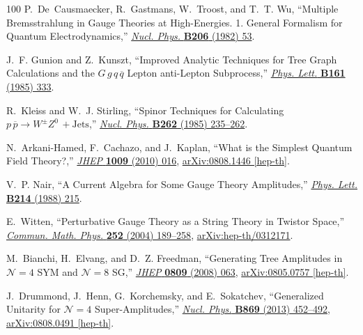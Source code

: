 \documentclass[12pt,hyperref,compress]{JHEP3}
\renewcommand{\bar}{\overline}
\begin{document}
\begin{thebibliography}{100}
P.~De~Causmaecker, R.~Gastmans, W.~Troost, and T.~T. Wu, ``{Multiple
  Bremsstrahlung in Gauge Theories at High-Energies. 1. General Formalism for
  Quantum Electrodynamics},''
\href{http://dx.doi.org/10.1016/0550-3213(82)90488-6}{{\em Nucl. Phys.} {\bf
  B206} (1982)  53}.

J.~F. Gunion and Z.~Kunszt, ``{Improved Analytic Techniques for Tree Graph
  Calculations and the $G\, g\, q\, \bar{q}$ Lepton anti-Lepton Subprocess},''
\href{http://dx.doi.org/10.1016/0370-2693(85)90774-9}{{\em Phys. Lett.} {\bf
  B161} (1985)  333}.

R.~Kleiss and W.~J. Stirling, ``{Spinor Techniques for Calculating
  $p\,\bar{p}\to W^\pm Z^0\,+\mathrm{Jets}$},''
\href{http://dx.doi.org/10.1016/0550-3213(85)90285-8}{{\em Nucl. Phys.} {\bf
  B262} (1985)  235--262}.

N.~Arkani-Hamed, F.~Cachazo, and J.~Kaplan, ``{What is the Simplest Quantum
  Field Theory?},'' \href{http://dx.doi.org/10.1007/JHEP09(2010)016}{{\em JHEP}
  {\bf 1009} (2010)  016},
\href{http://arxiv.org/abs/0808.1446}{{ arXiv:0808.1446 [hep-th]}}.

V.~P. Nair, ``{A Current Algebra for Some Gauge Theory Amplitudes},''
\href{http://dx.doi.org/10.1016/0370-2693(88)91471-2}{{\em Phys. Lett.} {\bf
  B214} (1988)  215}.

E.~Witten, ``{Perturbative Gauge Theory as a String Theory in Twistor Space},''
  \href{http://dx.doi.org/10.1007/s00220-004-1187-3}{{\em Commun. Math. Phys.}
  {\bf 252} (2004)  189--258},
\href{http://arxiv.org/abs/hep-th/0312171}{{ arXiv:hep-th/0312171}}.

M.~Bianchi, H.~Elvang, and D.~Z. Freedman, ``{Generating Tree Amplitudes in
  $\mathcal{N}\!=\!4$ SYM and $\mathcal{N}\!=\!8$ SG},''
  \href{http://dx.doi.org/10.1088/1126-6708/2008/09/063}{{\em JHEP} {\bf 0809}
  (2008)  063},
\href{http://arxiv.org/abs/0805.0757}{{ arXiv:0805.0757 [hep-th]}}.

J.~Drummond, J.~Henn, G.~Korchemsky, and E.~Sokatchev, ``{Generalized Unitarity
  for $\mathcal{N}\!=\!4$ Super-Amplitudes},''
  \href{http://dx.doi.org/10.1016/j.nuclphysb.2012.12.009}{{\em Nucl. Phys.}
  {\bf B869} (2013)  452--492},
\href{http://arxiv.org/abs/0808.0491}{{ arXiv:0808.0491 [hep-th]}}.


\end{thebibliography}
\end{document}
